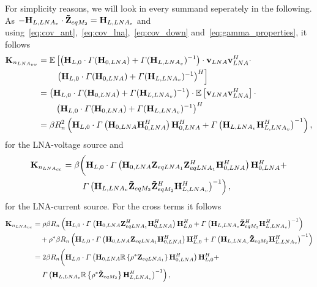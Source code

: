 For simplicity reasons, we will look in every summand seperately in the following.
As $-\mathbf{H}_{L,LNA_v}\cdot\mathbf{\tilde{Z}}_{eqM_2} = \mathbf{H}_{L,LNA_c}$ and using~\eqref{eq:cov_ant},~\eqref{eq:cov_lna},~\eqref{eq:cov_down} and~\eqref{eq:gamma_properties}, it follows
\begin{align}
\nonumber
\mathbf{K}_{n_{LNA_{vv}}} &= \mathbb{E}\left[\left(\mathbf{H}_{L,0}\cdot\Gamma(\mathbf{H}_{0,LNA})+\Gamma(\mathbf{H}_{L,LNA_v})^{-1}\right)\cdot\mathbf{v}_{LNA}\mathbf{v}_{LNA}^H\cdot\right.\\\nonumber
&\qquad\left.\left(\mathbf{H}_{L,0}\cdot\Gamma(\mathbf{H}_{0,LNA})+\Gamma(\mathbf{H}_{L,LNA_v})^{-1}\right)^H\right]\\\nonumber
&=\left(\mathbf{H}_{L,0}\cdot\Gamma(\mathbf{H}_{0,LNA})+\Gamma(\mathbf{H}_{L,LNA_v})^{-1}\right)\cdot\mathbb{E}\left[\mathbf{v}_{LNA}\mathbf{v}_{LNA}^H\right]\cdot\\\nonumber
&\qquad\left(\mathbf{H}_{L,0}\cdot\Gamma(\mathbf{H}_{0,LNA})+\Gamma(\mathbf{H}_{L,LNA_v})^{-1}\right)^H\\
&=\beta R_n^2\left(\mathbf{H}_{L,0}\cdot\Gamma\left(\mathbf{H}_{0,LNA}\mathbf{H}_{0,LNA}^H\right)\mathbf{H}_{0,LNA}^H+\Gamma\left(\mathbf{H}_{L,LNA_v}\mathbf{H}_{L,LNA_v}^H\right)^{-1}\right),
\end{align}
for the LNA-voltage source and
\begin{align}
\nonumber
\mathbf{K}_{n_{LNA_{cc}}} &= 
\beta \biggl(\mathbf{H}_{L,0}\cdot\Gamma\left(\mathbf{H}_{0,LNA}\mathbf{Z}_{eqLNA_1}\mathbf{Z}_{eqLNA_1}^H\mathbf{H}_{0,LNA}^H\right)\mathbf{H}_{0,LNA}^H+\\
&\qquad\left.\Gamma\left(\mathbf{H}_{L,LNA_v}\mathbf{\tilde{Z}}_{eqM_2}\mathbf{\tilde{Z}}_{eqM_2}^H\mathbf{H}_{L,LNA_v}^H\right)^{-1}\right),
\end{align}
for the LNA-current source.
For the cross terms it follows
\begin{align}
\nonumber
\mathbf{K}_{n_{LNA_{vc}}} &= \rho\beta R_n
\left(\mathbf{H}_{L,0}\cdot\Gamma\left(\mathbf{H}_{0,LNA}\mathbf{Z}_{eqLNA_1}^H\mathbf{H}_{0,LNA}^H\right)\mathbf{H}_{L,0}^H + 
\Gamma\left(\mathbf{H}_{L,LNA_v}\mathbf{\tilde{Z}}_{eqM_2}^H\mathbf{H}_{L,LNA_v}^H\right)^{-1}\right)\\\nonumber
&\quad+
\rho^*\beta R_n
\left(\mathbf{H}_{L,0}\cdot\Gamma\left(\mathbf{H}_{0,LNA}\mathbf{Z}_{eqLNA_1}\mathbf{H}_{0,LNA}^H\right)\mathbf{H}_{L,0}^H + 
\Gamma\left(\mathbf{H}_{L,LNA_v}\mathbf{\tilde{Z}}_{eqM_2}\mathbf{H}_{L,LNA_v}^H\right)^{-1}\right)\\\nonumber
&= 2 \beta R_n\biggl(
\mathbf{H}_{L,0}\cdot\Gamma\left(\mathbf{H}_{0,LNA}\mathbb{R}\left\{\rho^*\mathbf{Z}_{eqLNA_1}\right\}\mathbf{H}_{0,LNA}^H\right)\mathbf{H}_{L,0}^H + \\
&\quad\left.\Gamma\left(\mathbf{H}_{L,LNA_v}\mathbb{R}\left\{\rho^*\mathbf{\tilde{Z}}_{eqM_2}\right\}\mathbf{H}_{L,LNA_v}^H\right)^{-1}\right),
\end{align}
